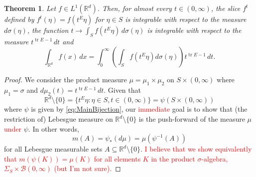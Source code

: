 \documentclass{article}
\theoremstyle{theorem}
\newtheorem{theorem}{Theorem}
\theoremstyle{remark}
\newcommand\tr{\operatorname{tr}}
\begin{document}
\begin{theorem}
Let $f\in L^1(\mathbb{R}^d)$. Then, for almost every $t\in (0,\infty) $, the slice $f^t$ defined by $f^t(\eta)=f(t^E\eta)$ for $\eta \in S$ is integrable with respect to the measure $d\sigma(\eta)$, the function $t\to \int_S f(t^E\eta)\,d \sigma(\eta)$ is integrable with respect to the measure $t^{\tr E-1}\,dt$ and
\begin{equation*}
\int_{\mathbb{R}^d} f(x)\,dx=\int_0^\infty \left(\int_S f(t^E\eta)d\sigma(\eta)\right) t^{\tr E-1}\,dt.
\end{equation*}
\end{theorem}
\begin{proof}
We consider the product measure $\mu=\mu_1\times\mu_2$ on $S\times (0,\infty)$ where $\mu_1=\sigma$ and $d\mu_2(t)=t^{\tr E-1}\,dt$. Given that
\begin{equation*}
\mathbb{R}^d\setminus \{0\}=\{t^E\eta:\eta\in S,t\in (0,\infty)\}=\psi\left(S\times (0,\infty)\right)
\end{equation*}
where $\psi$ is given by \eqref{eq:MainBijection}, our \textcolor{red}{immediate} goal is to show that (the restriction of) Lebesgue measure on $\mathbb{R}^d\setminus \{0\}$ is the push-forward of the measure $\mu$ \textcolor{red}{under} $\psi$. In other words, 
\begin{equation*}
m(A)=\psi_*(d\mu)=\mu(\psi^{-1}(A))
\end{equation*}
for all Lebesgue measurable sets $A\subseteq \mathbb{R}^d\setminus \{0\}$.  \textcolor{red}{I believe that we show equivalently that $m(\psi(K))=\mu(K)$ for all elements $K$ in the product $\sigma$-algebra, $\Sigma_S\times \mathcal{B}(0,\infty)$ (but I'm not sure).}


\end{proof}
\end{document}
